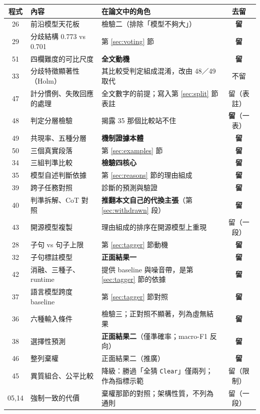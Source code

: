 \documentclass[11pt,a4paper]{ctexart}
\newcommand{\fn}[1]{\texttt{#1}}
\begin{document}
\begin{longtable}{@{}clp{6.6cm}c@{}}
\toprule
程式 & 內容 & 在論文中的角色 & 去留 \\
\midrule
\endhead
26 & 前沿模型天花板 & 檢驗二（排除「模型不夠大」） & \textbf{留} \\
29 & 分歧結構 0.773 vs 0.701 & 第 \ref{sec:voting} 節 & \textbf{留} \\
51 & 四欄難度的可比尺度 & \textbf{全文動機} & \textbf{留} \\
33 & 分歧特徵顯著性（Holm） & 其比較受判定組成混淆，改由 48／49 取代 & 不留 \\
47 & 計分慣例、失敗回應的處理 & 全文數字的前提；寫入第 \ref{sec:split} 節表註 & 留（表註）\\
48 & 判定分層檢驗 & 揭露 35 那個比較站不住 & \textbf{留}（一表）\\
49 & 共現率、五種分層 & \textbf{機制證據本體} & \textbf{留} \\
50 & 三個真實段落 & 第 \ref{sec:examples} 節 & \textbf{留} \\
34 & 三組判準比較 & \textbf{檢驗四核心} & \textbf{留} \\
35 & 模型自述判斷依據 & 第 \ref{sec:reasons} 節的理由組成 & \textbf{留} \\
39 & 跨子任務對照 & 診斷的預測與驗證 & \textbf{留} \\
40 & 判準拆解、CoT 對照 & \textbf{推翻本文自己的代換主張}（第 \ref{sec:withdrawn} 段） & \textbf{留} \\
43 & 開源模型複製 & 理由組成的排序在開源模型上重現 & 留（一段）\\
28 & 子句 vs 句子上限 & 第 \ref{sec:tagger} 節動機 & \textbf{留} \\
32 & 子句標註模型 & \textbf{正面結果一} & \textbf{留} \\
42 & 消融、三種子、runtime & 提供 baseline 與噪音帶，是第 \ref{sec:tagger} 節的依據 & \textbf{留} \\
37 & 語言模型跨度 baseline & 第 \ref{sec:tagger} 節對照 & \textbf{留} \\
36 & 六種輸入條件 & 檢驗三；正對照不顯著，列為虛無結果 & \textbf{留} \\
38 & 選擇性預測 & \textbf{正面結果二}（僅準確率；macro-F1 反向）& \textbf{留} \\
46 & 整列棄權 & 正面結果二（推廣） & \textbf{留} \\
45 & 異質組合、公平比較 & 降級：勝過「全猜 \fn{Clear}」僅兩列；作為指標示範 & 留（限制）\\
05,14 & 強制一致的代價 & 棄權那節的對照；架構性質，不列為通則 & 留（一段）\\

\end{longtable}
\end{document}
